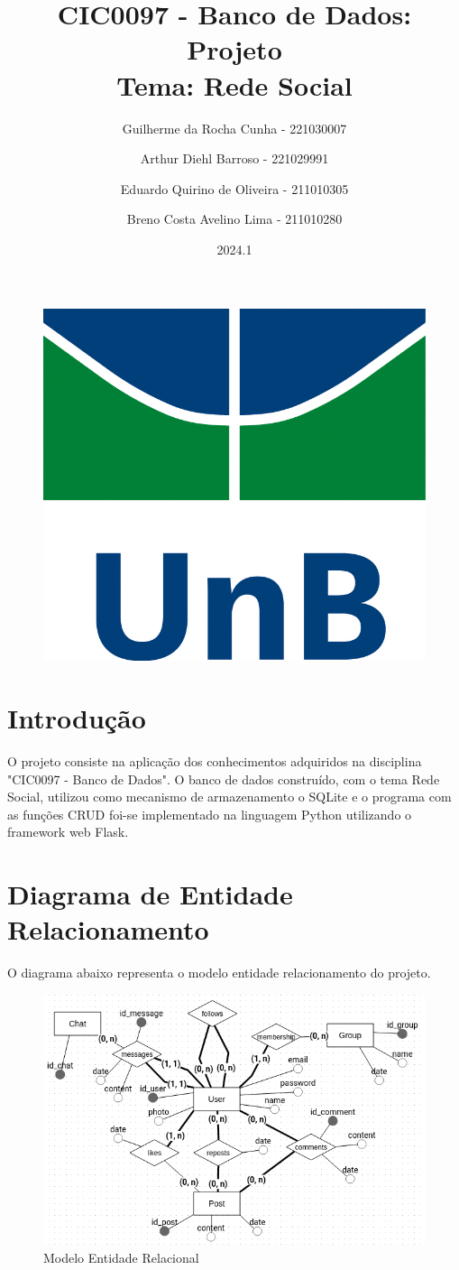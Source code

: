 \documentclass{article}
\title{CIC0097 - Banco de Dados: Projeto \\
        \large \textbf{Tema:} Rede Social}
\author{Guilherme da Rocha Cunha - 221030007 \\
        \and
        Arthur Diehl Barroso - 221029991 \\
        \and
        Eduardo Quirino de Oliveira - 211010305 \\
        \and 
        Breno Costa Avelino Lima - 211010280}
\date{2024.1}
\begin{document}
\pagestyle{fancy}

\maketitle

\begin{figure}[ht]
        \centering
        \includegraphics[width=.5\textwidth]{imagens/logo_unb.jpg}
\end{figure}

\newpage

\fancyhead{}
\fancyfoot[C]{\thepage}


\renewcommand*\contentsname{Sumário}
\tableofcontents

\newpage

\section{Introdução}
O projeto consiste na aplicação dos conhecimentos adquiridos na disciplina "CIC0097 - Banco de Dados". O banco de dados construído, com o tema Rede Social, utilizou como mecanismo de armazenamento o SQLite e o programa com as funções CRUD foi-se implementado na linguagem Python utilizando o framework web Flask.

\section{Diagrama de Entidade Relacionamento}
\label{sec:mer}
O diagrama abaixo representa o modelo entidade relacionamento do projeto.

\begin{figure}[!ht]
        \centering
        \includegraphics[width=1\textwidth]{imagens/mer.png}
        \caption{Modelo Entidade Relacional}
\end{figure}
\end{document}
